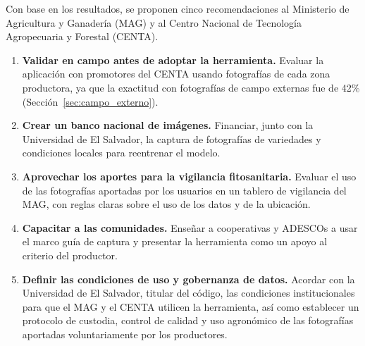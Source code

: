 Con base en los resultados, se proponen cinco recomendaciones al Ministerio de Agricultura y Ganader\'ia (MAG) y al Centro Nacional de Tecnolog\'ia Agropecuaria y Forestal (CENTA).

\begin{enumerate}
\item \textbf{Validar en campo antes de adoptar la herramienta.} Evaluar la aplicaci\'on con promotores del CENTA usando fotograf\'ias de cada zona productora, ya que la exactitud con fotograf\'ias de campo externas fue de 42\% (Secci\'on~\ref{sec:campo_externo}).
\item \textbf{Crear un banco nacional de im\'agenes.} Financiar, junto con la Universidad de El Salvador, la captura de fotograf\'ias de variedades y condiciones locales para reentrenar el modelo.
\item \textbf{Aprovechar los aportes para la vigilancia fitosanitaria.} Evaluar el uso de las fotograf\'ias aportadas por los usuarios en un tablero de vigilancia del MAG, con reglas claras sobre el uso de los datos y de la ubicaci\'on.
\item \textbf{Capacitar a las comunidades.} Ense\~nar a cooperativas y ADESCOs a usar el marco gu\'ia de captura y presentar la herramienta como un apoyo al criterio del productor.
\item \textbf{Definir las condiciones de uso y gobernanza de datos.} Acordar con la Universidad de El Salvador, titular del c\'odigo, las condiciones institucionales para que el MAG y el CENTA utilicen la herramienta, as\'i como establecer un protocolo de custodia, control de calidad y uso agron\'omico de las fotograf\'ias aportadas voluntariamente por los productores.
\end{enumerate}


